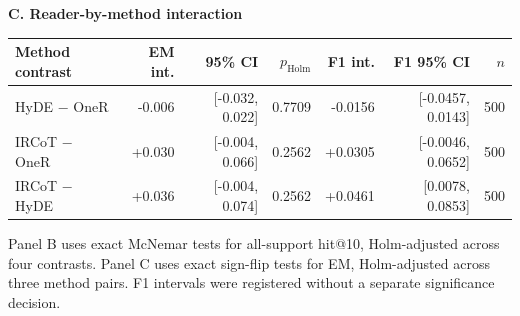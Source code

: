\begin{table}[t]
\vspace{5pt}
\textbf{C. Reader-by-method interaction}\par\vspace{2pt}
\begin{tabular}{lrrrrrr}
\toprule
Method contrast & EM int. & 95\% CI & $p_{\mathrm{Holm}}$ & F1 int. & F1 95\% CI & $n$ \\
\midrule
HyDE $-$ OneR & -0.006 & [-0.032, 0.022] & 0.7709 & -0.0156 & [-0.0457, 0.0143] & 500 \\
IRCoT $-$ OneR & +0.030 & [-0.004, 0.066] & 0.2562 & +0.0305 & [-0.0046, 0.0652] & 500 \\
IRCoT $-$ HyDE & +0.036 & [-0.004, 0.074] & 0.2562 & +0.0461 & [0.0078, 0.0853] & 500 \\
\bottomrule
\end{tabular}
\par\smallskip
\parbox{0.97\textwidth}{\footnotesize Panel B uses exact McNemar tests for all-support hit@10, Holm-adjusted across four contrasts. Panel C uses exact sign-flip tests for EM, Holm-adjusted across three method pairs. F1 intervals were registered without a separate significance decision.}
\end{table}
